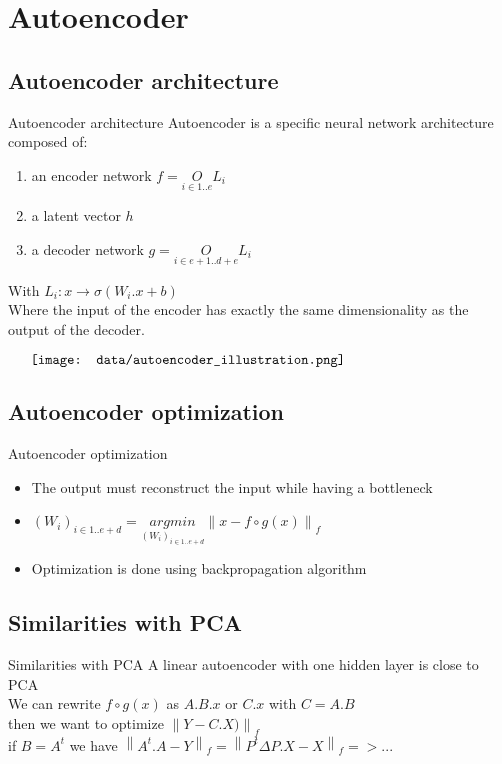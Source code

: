 \documentclass{beamer}
\newcommand{\norm}[1]{\left\lVert#1\right\rVert}
\begin{document}
\section{Autoencoder}
\subsection{Autoencoder architecture}
\begin{frame}{Autoencoder architecture}
    Autoencoder is a specific neural network architecture composed of:
    \begin{enumerate}
	\item an encoder network $f = \underset{i \in {{1 .. e}}}{O} L_i$
        \item a latent vector $h$
	\item a decoder network $g = \underset{i \in {{e + 1 .. d + e}}}{O} L_i$
    \end{enumerate}
    With $L_i : x \rightarrow \sigma(W_i.x + b)$ \\
    Where the input of the encoder has exactly the same dimensionality as the output of the decoder. \\
    \begin{minipage}{6in}
    \centering
    $\vcenter{
    \texttt{[image: data/autoencoder\_illustration.png]}
    }$
    \end{minipage}
\end{frame}

\subsection{Autoencoder optimization}
\begin{frame}{Autoencoder optimization}
	\begin{itemize}
		\item The output must reconstruct the input while having a bottleneck
		\item $(W_i)_{i \in {1 .. e+d}} = \underset{(W_i)_{i \in {1 .. e+d}}}{argmin} \norm{ x - f \circ g(x)}_f$
		\item Optimization is done using backpropagation algorithm
	\end{itemize}
\end{frame}

\subsection{Similarities with PCA}
\begin{frame}{Similarities with PCA}
	A linear autoencoder with one hidden layer is close to PCA\\
	We can rewrite $ f \circ g (x)$ as $A.B.x$ or $C.x$ with $C = A.B$\\
	then we want to optimize $\norm{ Y - C.X)}_f$ \\ 
	if $B = A^{t}$ we have $\norm{A^{t}.A - Y}_f = \norm{ P^t \Delta P. X - X}_f => ... $
\end{frame}
\end{document}
